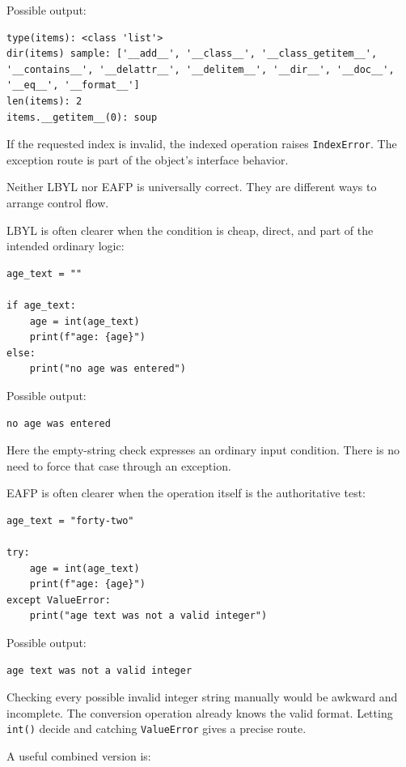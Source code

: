 \documentclass[a4paper,twoside]{report}
\begin{document}
Possible output:

\begin{verbatim}
type(items): <class 'list'>
dir(items) sample: ['__add__', '__class__', '__class_getitem__',
'__contains__', '__delattr__', '__delitem__', '__dir__', '__doc__',
'__eq__', '__format__']
len(items): 2
items.__getitem__(0): soup
\end{verbatim}

If the requested index is invalid, the indexed operation raises \texttt{IndexError}. The exception route is part of the object's interface behavior.

Neither LBYL nor EAFP is universally correct. They are different ways to arrange control flow.

LBYL is often clearer when the condition is cheap, direct, and part of the intended ordinary logic:

\begin{verbatim}
age_text = ""

if age_text:
    age = int(age_text)
    print(f"age: {age}")
else:
    print("no age was entered")
\end{verbatim}

Possible output:

\begin{verbatim}
no age was entered
\end{verbatim}

Here the empty-string check expresses an ordinary input condition. There is no need to force that case through an exception.

EAFP is often clearer when the operation itself is the authoritative test:

\begin{verbatim}
age_text = "forty-two"

try:
    age = int(age_text)
    print(f"age: {age}")
except ValueError:
    print("age text was not a valid integer")
\end{verbatim}

Possible output:

\begin{verbatim}
age text was not a valid integer
\end{verbatim}

Checking every possible invalid integer string manually would be awkward and incomplete. The conversion operation already knows the valid format. Letting \texttt{int()} decide and catching \texttt{ValueError} gives a precise route.

A useful combined version is:
\end{document}
